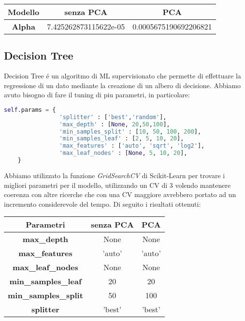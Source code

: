 \documentclass[../../Report.tex]{subfiles}
\begin{document}
\begin{table}[h]
    \centering
    \begin{tabular}{|c|c|c|}
    \hline
\textbf{Modello} & \textbf{senza PCA} & \textbf{PCA} \\ \hline
\textbf{Alpha} &  7.425262873115622e-05 &   0.0005675190692206821 \\ \hline
\end{tabular}
\end{table}

\subsection{Decision Tree}
Decision Tree é un algoritmo di ML supervisionato che permette di effettuare la regressione di un dato mediante la creazione di un albero di decisione.
Abbiamo avuto bisogno di fare il tuning di piu parametri, in particolare:
\begin{lstlisting}[language=Python]
    self.params = {
                'splitter' : ['best','random'],
                'max_depth' : [None, 20,50,100],
                'min_samples_split' : [10, 50, 100, 200],
                'min_samples_leaf' : [2, 5, 10, 20],
                'max_features' : ['auto', 'sqrt', 'log2'],
                'max_leaf_nodes' : [None, 5, 10, 20],
    }
\end{lstlisting}
Abbiamo utilizzato la funzione \textit{GridSearchCV} di Scikit-Learn per trovare i migliori parametri per il modello, utilizzando un CV di 3 volendo mantenere coerenza con altre ricerche che con una CV maggiore avrebbero portato ad un incremento considerevole del tempo.
Di seguito i risultati ottenuti:
\begin{table}[h]
    \centering
    \begin{tabular}{|c|c|c|}
    \hline
\textbf{Parametri} & \textbf{senza PCA} & \textbf{PCA} \\ \hline
\textbf{max\_depth}& None & None\\
\textbf{max\_features}& 'auto' &  'auto' \\
\textbf{max\_leaf\_nodes}& None & None\\
\textbf{min\_samples\_leaf}& 20 & 20\\
\textbf{min\_samples\_split}& 50 & 100\\
\textbf{splitter}& 'best' &  'best'\\
\hline
\end{tabular}
\end{table}
\end{document}
